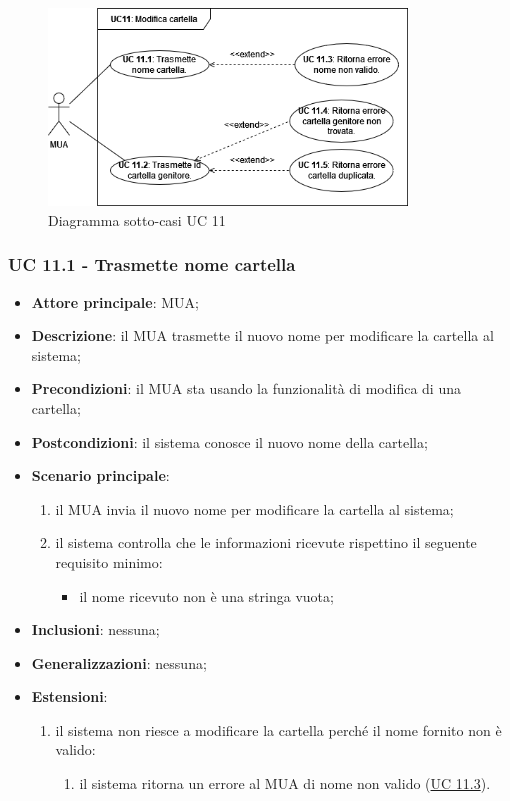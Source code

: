 \begin{figure}[H]
    \includegraphics[width=0.85\textwidth]{sections/uc_imgs/UC11.png}
    \centering
    \caption{Diagramma sotto-casi UC 11}
\end{figure}

\subsubsection{UC 11.1 - Trasmette nome cartella} \label{sec:UC11.1}
\begin{itemize}
    \item \textbf{Attore principale}: MUA;
    \item \textbf{Descrizione}: il MUA trasmette il nuovo nome per modificare la cartella al sistema;
    \item \textbf{Precondizioni}: il MUA sta usando la funzionalità di modifica di una cartella;
    \item \textbf{Postcondizioni}: il sistema conosce il nuovo nome della cartella;
    \item \textbf{Scenario principale}:
        \begin{enumerate}
            \item il MUA invia il nuovo nome per modificare la cartella al sistema;
            \item il sistema controlla che le informazioni ricevute rispettino il seguente requisito minimo:
            \begin{itemize}
                \item il nome ricevuto non è una stringa vuota;
            \end{itemize}
        \end{enumerate}
    \item \textbf{Inclusioni}: nessuna;
    \item \textbf{Generalizzazioni}: nessuna;
    \item \textbf{Estensioni}:
        \begin{enumerate}[label=\alph*.]
            \item il sistema non riesce a modificare la cartella perché il nome fornito non è valido:
            \begin{enumerate}[label=\arabic*.]
                \item il sistema ritorna un errore al MUA di nome non valido (\hyperref[sec:UC11.3]{UC 11.3}).
            \end{enumerate}
        \end{enumerate}
\end{itemize}

